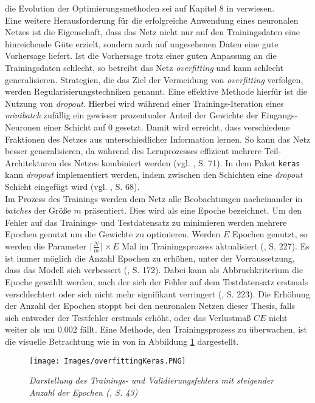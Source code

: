 \documentclass[a4paper,11pt]{article}
\begin{document}
die Evolution der Optimierungsmethoden sei auf Kapitel 8 in \cite{deepL} verwiesen. \\

Eine weitere Herausforderung für die erfolgreiche Anwendung eines neuronalen Netzes ist die Eigenschaft, dass das Netz nicht nur auf den Trainingsdaten eine hinreichende Güte erzielt, sondern auch auf ungesehenen Daten eine gute Vorhersage liefert. Ist die Vorhersage trotz einer guten Anpassung an die Trainingsdaten schlecht, so betreibt das Netz \textit{overfitting} und kann schlecht generalisieren. Strategien, die das Ziel der Vermeidung von \textit{overfitting} verfolgen, werden Regularisierungstechniken genannt. Eine effektive Methode hierfür ist die Nutzung von \textit{dropout}. Hierbei wird während einer Trainings-Iteration eines \textit{minibatch} zufällig ein gewisser prozentualer Anteil der Gewichte der Eingangs-Neuronen einer Schicht auf $0$ gesetzt. Damit wird erreicht, dass verschiedene Fraktionen des Netzes aus unterschiedlicher Information lernen. So kann das Netz besser generalisieren, da während des Lernprozesses effizient mehrere Teil-Architekturen des Netzes kombiniert werden (vgl. \cite{deepEssentials}, S. 71). In dem Paket \texttt{keras} kann \textit{dropout} implementiert werden, indem zwischen den Schichten eine \textit{dropout} Schicht eingefügt wird (vgl. \cite{keras}, S. 68).\\
Im Prozess des Trainings werden dem Netz alle Beobachtungen nacheinander in \textit{batches} der Größe $m$ präsentiert. Dies wird als eine Epoche bezeichnet. Um den Fehler auf das Trainings- und Testdatensatz zu minimieren werden mehrere Epochen genutzt um die Gewichte zu optimieren. Werden $E$ Epochen genutzt, so werden die Parameter $\lceil \frac{N}{m} \rceil \times E$ Mal im Trainingsprozess aktualisiert (\cite{deepNLP}, S. 227). Es ist immer möglich die Anzahl Epochen zu erhöhen, unter der Vorraussetzung, dass das Modell sich verbessert (\cite{deepNLP}, S. 172). Dabei kann als Abbruchkriterium die Epoche gewählt werden, nach der sich der Fehler auf dem Testdatensatz erstmals verschlechtert oder sich nicht mehr signifikant verringert (\cite{deepEssentials}, S. 223). Die Erhöhung der Anzahl der Epochen stoppt bei den neuronalen Netzen dieser Thesis, falls sich entweder der  Testfehler erstmals erhöht, oder das Verlustmaß $CE$ nicht weiter als um $0.002$ fällt. Eine Methode, den Trainingsprozess zu überwachen, ist die visuelle Betrachtung wie in von in Abbildung \ref{abb:overfitting} dargestellt.

\begin{figure}[!ht]
\begin{center}
\texttt{[image: Images/overfittingKeras.PNG]}
\caption{\textit{Darstellung des Trainings- und Validierungsfehlers mit steigender Anzahl der Epochen (\cite{keras}, S. 43)}}
\label{abb:overfitting}
\end{center}
\end{figure}
\end{document}
